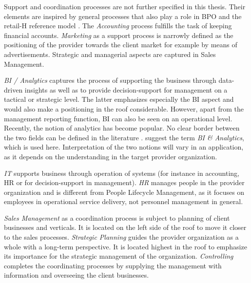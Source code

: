 	 Support and coordination processes are not further specified in this thesis. Their elements are inspired by general processes that also play a role in \acrshort{BPO} and the retail-H reference model \cite{becker2004handelsinformationssysteme}. The \textit{Accounting} process fulfills the task of keeping financial accounts. \textit{Marketing} as a support process is narrowly defined as the positioning of the provider towards the client market for example by means of advertisements. Strategic and managerial aspects are captured in Sales Management. 
	 
	 \textit{\acrfull{BI} / Analytics} captures the process of supporting the business through data-driven insights as well as to provide decision-support for management on a tactical or strategic level. The latter emphasizes especially the \acrshort{BI} aspect and would also make a positioning in the roof considerable. However, apart from the management reporting function, \acrshort{BI} can also be seen on an operational level. Recently, the notion of analytics has become popular. No clear border between the two fields can be defined in the literature \citep{mertens}. \cite{Chen:2012:BIA} suggest the term \textit{\acrshort{BI} \& Analytics}, which is used here. Interpretation of the two notions will vary in an application, as it depends on the understanding in the target provider organization. 
	  
	  \textit{IT} supports business through operation of systems (for instance in accounting, HR or for decision-support in management). \textit{HR} manages people in the provider organization and is different from People Lifecycle Management, as it focuses on  employees in operational service delivery, not personnel management in general. 
	  
	  \textit{Sales Management} as a coordination process is subject to planning of client businesses and verticals. It is located on the left side of the roof to move it closer to the sales processes. \textit{Strategic Planning} guides the provider organization as a whole with a long-term perspective. It is located highest in the roof to emphasize its importance for the strategic management of the organization. \textit{Controlling} completes the coordinating processes by supplying the management with information and overseeing the client businesses. 
	 	 
